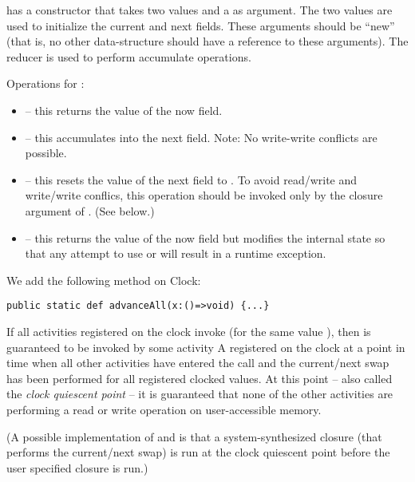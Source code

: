  has a constructor that takes two  values and a
 as argument. The two  values are used to initialize the
current and next fields. These arguments should be ``new'' (that is, no
other data-structure should have a reference to these arguments). The
reducer is used to perform accumulate operations.

Operations for :
\begin{itemize}
\item {} -- this returns the value of the now field.
\item{} -- this accumulates  into the next field. Note: No
     write-write conflicts are possible.
\item{} -- this resets the value of the next field to . To avoid
     read/write and write/write conflics, this operation should be
     invoked only by the closure argument of
     . (See below.)
\item {} -- this returns the value of the now field but
     modifies the internal state so that any attempt to use  
     or  will result in a runtime exception.
\end{itemize}

We add the following method on Clock:
\begin{lstlisting}
public static def advanceAll(x:()=>void) {...}
\end{lstlisting}

If all activities registered on the clock invoke 
(for the same value ), then  is guaranteed to be
invoked by some activity A registered on the clock at a point in time
when all other activities have entered the  call
and the current/next swap has been performed for all registered
clocked values.  At this point -- also called the {\em clock quiescent
point} -- it is guaranteed that none of the other activities are
performing a read or write operation on user-accessible memory.

(A possible implementation of  and
 is that a system-synthesized closure (that
performs the current/next swap) is run at the clock quiescent point
before the user specified closure is run.)



